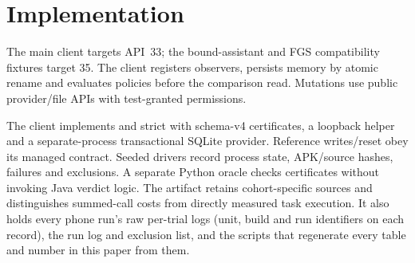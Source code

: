 \section{Implementation}
\label{sec:impl}
The main client targets API~33; the bound-assistant and FGS compatibility fixtures target 35. The client registers observers, persists memory by atomic rename and evaluates policies before the comparison read. Mutations use public provider/file APIs with test-granted permissions.

The client implements \stamp and strict \sys with schema-v4 certificates, a loopback helper and a separate-process transactional SQLite provider. Reference writes/reset obey its managed contract. Seeded drivers record process state, APK/source hashes, failures and exclusions. A separate Python oracle checks certificates without invoking Java verdict logic. The artifact retains cohort-specific sources and distinguishes summed-call costs from directly measured task execution. It also holds every phone run's raw per-trial logs (unit, build and run identifiers on each record), the run log and exclusion list, and the scripts that regenerate every table and number in this paper from them.
